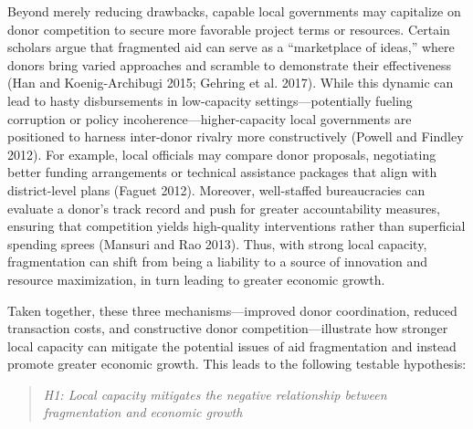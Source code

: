 \documentclass[11pt]{article}
\begin{document}
Beyond merely reducing drawbacks, capable local governments may capitalize on donor competition to secure more favorable project terms or resources. Certain scholars argue that fragmented aid can serve as a “marketplace of ideas,” where donors bring varied approaches and scramble to demonstrate their effectiveness (Han and Koenig-Archibugi 2015; Gehring et al. 2017). While this dynamic can lead to hasty disbursements in low-capacity settings—potentially fueling corruption or policy incoherence—higher-capacity local governments are positioned to harness inter-donor rivalry more constructively (Powell and Findley 2012). For example, local officials may compare donor proposals, negotiating better funding arrangements or technical assistance packages that align with district-level plans (Faguet 2012). Moreover, well-staffed bureaucracies can evaluate a donor’s track record and push for greater accountability measures, ensuring that competition yields high-quality interventions rather than superficial spending sprees (Mansuri and Rao 2013). Thus, with strong local capacity, fragmentation can shift from being a liability to a source of innovation and resource maximization, in turn leading to greater economic growth.

Taken together, these three mechanisms—improved donor coordination, reduced transaction costs, and constructive donor competition—illustrate how stronger local capacity can mitigate the potential issues of aid fragmentation and instead promote greater economic growth. This leads to the following testable hypothesis:
\begin{quote}
    
\textit{H1: Local capacity mitigates the negative relationship between fragmentation and economic growth}
\end{quote}
\end{document}
